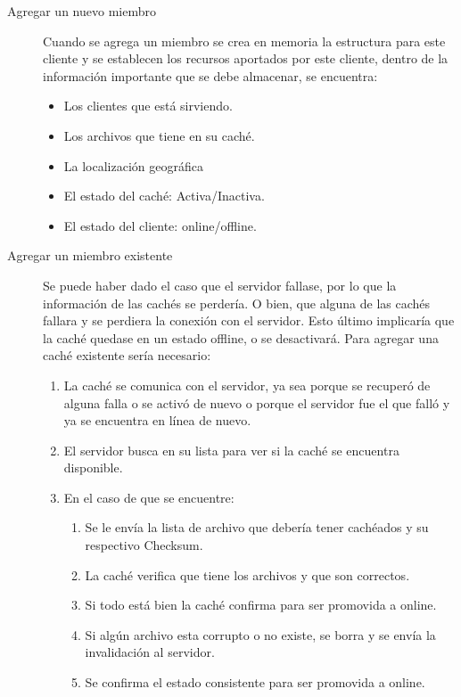 \begin{description}
\item[Agregar un nuevo miembro] Cuando se agrega un miembro se crea en memoria la estructura para este cliente y se establecen los recursos aportados por este cliente, dentro de la información importante que se debe almacenar, se encuentra:
	\begin{itemize}
	\item Los clientes que está sirviendo.
	\item Los archivos que tiene en su caché.
	\item La localización geográfica 
	\item El estado del caché: Activa/Inactiva.
	\item El estado del cliente: online/offline.
	\end{itemize}
	
\item [Agregar un miembro existente] Se puede haber dado el caso que el servidor fallase, por lo que la información de las cachés se perdería. O bien, que alguna de las cachés fallara y se perdiera la conexión con el servidor. Esto último implicaría que la caché quedase en un estado offline, o se desactivará. Para agregar una caché existente sería necesario:

	\begin{enumerate}
	\item La caché se comunica con el servidor, ya sea porque se recuperó de alguna falla o se activó de nuevo o porque el servidor fue el que falló y ya se encuentra en línea de nuevo.
	\item El servidor busca en su lista para ver si la caché se encuentra disponible.
	\item En el caso de que se encuentre:

		\begin{enumerate}
		\item Se le envía la lista de archivo que debería tener cachéados y su respectivo Checksum.
		\item La caché verifica que tiene los archivos y que son correctos.
		\item Si todo está bien la caché confirma para ser promovida a online.
		\item Si algún archivo esta corrupto o no existe, se borra y se envía la invalidación al servidor.
		\item Se confirma el estado consistente para ser promovida a online.
		\end{enumerate}	
	

\end{enumerate}
\end{description}
